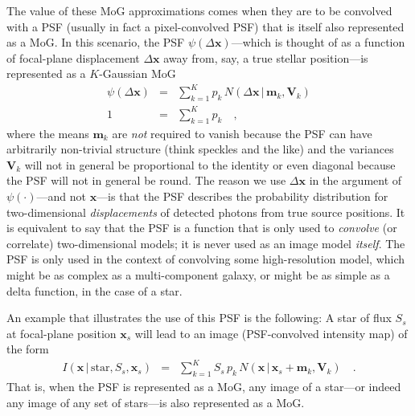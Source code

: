 \documentclass[12pt,pdftex,preprint]{aastex}
\newcommand{\tmatrix}[1]{\boldsymbol{#1}}
\newcommand{\tvector}[1]{\boldsymbol{#1}}
\newcommand{\pos}{\tvector{x}}
\newcommand{\mean}{\tvector{m}}
\newcommand{\var}{\tmatrix{V}}
\newcommand{\normal}{N}
\newcommand{\given}{\,|\,}
\renewcommand{\star}{\mathrm{star}}
\begin{document}
The value of these MoG approximations comes when they are to be
convolved with a PSF (usually in fact a pixel-convolved PSF) that is
itself also represented as a MoG.  In this scenario, the PSF
$\psi(\Delta\pos)$---which is thought of as a function of focal-plane
displacement $\Delta\pos$ away from, say, a true stellar position---is
represented as a $K$-Gaussian MoG
\begin{eqnarray}\displaystyle
\psi(\Delta\pos) &=& \sum_{k=1}^K p_k\,\normal(\Delta\pos\given\mean_k,\var_k)
\\
1 &=& \sum_{k=1}^K p_k
\quad ,
\end{eqnarray}
where the means $\mean_k$ are \emph{not} required to vanish because
the PSF can have arbitrarily non-trivial structure (think speckles and
the like) and the variances $\var_k$ will not in general be
proportional to the identity or even diagonal because the PSF will not
in general be round.  The reason we use $\Delta\pos$ in the argument
of $\psi(\cdot)$---and not $\pos$---is that the PSF describes the
probability distribution for two-dimensional \emph{displacements} of
detected photons from true source positions.  It is equivalent to say
that the PSF is a function that is only used to \emph{convolve} (or
correlate) two-dimensional models; it is never used as an image model
\emph{itself}.  The PSF is only used in the context of convolving some
high-resolution model, which might be as complex as a multi-component
galaxy, or might be as simple as a delta function, in the case of a
star.

An example that illustrates the use of this PSF is the following: A
star of flux $S_s$ at focal-plane position $\pos_s$ will lead to an
image (PSF-convolved intensity map) of the form
\begin{eqnarray}\displaystyle
I(\pos\given\star,S_s,\pos_s) &=& \sum_{k=1}^K S_s\,p_k\,\normal(\pos\given\pos_s+\mean_k,\var_k)
\quad .
\end{eqnarray}
That is, when the PSF is represented as a MoG, any image of a
star---or indeed any image of any set of stars---is also represented
as a MoG.
\end{document}
